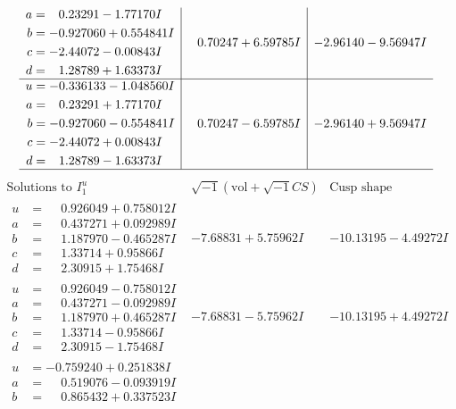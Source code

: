 \documentclass[1p]{elsarticle_modified}
\theoremstyle{definition}
\newcommand{\I}{\sqrt{-1}}
\begin{document}
$$\begin{array}{c|c|c}
\begin{aligned}
a &= \phantom{-}0.23291 - 1.77170 I \\
b &= -0.927060 + 0.554841 I \\
c &= -2.44072 - 0.00843 I \\
d &= \phantom{-}1.28789 + 1.63373 I\end{aligned}
 & \phantom{-}0.70247 + 6.59785 I & -2.96140 - 9.56947 I \\ \hline\begin{aligned}
u &= -0.336133 - 1.048560 I \\
a &= \phantom{-}0.23291 + 1.77170 I \\
b &= -0.927060 - 0.554841 I \\
c &= -2.44072 + 0.00843 I \\
d &= \phantom{-}1.28789 - 1.63373 I\end{aligned}
 & \phantom{-}0.70247 - 6.59785 I & -2.96140 + 9.56947 I\\
 \hline 
 \end{array}$$\newpage$$\begin{array}{c|c|c}  
\text{Solutions to }I^u_{1}& \I (\text{vol} + \sqrt{-1}CS) & \text{Cusp shape}\\
 \hline 
\begin{aligned}
u &= \phantom{-}0.926049 + 0.758012 I \\
a &= \phantom{-}0.437271 + 0.092989 I \\
b &= \phantom{-}1.187970 - 0.465287 I \\
c &= \phantom{-}1.33714 + 0.95866 I \\
d &= \phantom{-}2.30915 + 1.75468 I\end{aligned}
 & -7.68831 + 5.75962 I & -10.13195 - 4.49272 I \\ \hline\begin{aligned}
u &= \phantom{-}0.926049 - 0.758012 I \\
a &= \phantom{-}0.437271 - 0.092989 I \\
b &= \phantom{-}1.187970 + 0.465287 I \\
c &= \phantom{-}1.33714 - 0.95866 I \\
d &= \phantom{-}2.30915 - 1.75468 I\end{aligned}
 & -7.68831 - 5.75962 I & -10.13195 + 4.49272 I \\ \hline\begin{aligned}
u &= -0.759240 + 0.251838 I \\
a &= \phantom{-}0.519076 - 0.093919 I \\
b &= \phantom{-}0.865432 + 0.337523 I \\

\end{aligned}
\end{array}$$
\end{document}
